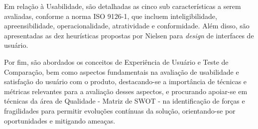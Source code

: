 Em relação à Usabilidade, são detalhadas as cinco sub características a serem avaliadas, conforme a norma ISO 9126-1, que incluem inteligibilidade, apreensibilidade, operacionalidade, 
atratividade e conformidade. Além disso, são apresentadas as dez heurísticas propostas por Nielsen para \textit{design} de interfaces de usuário. 

Por fim, são abordados os conceitos de Experiência de Usuário e Teste de Comparação, bem como aspectos fundamentais na avaliação de usabilidade e satisfação do usuário com o produto, 
destacando-se a importância de técnicas e métricas relevantes para a avaliação desses aspectos, e procurando apoiar-se em técnicas da área de Qualidade - Matriz de SWOT - na identificação de 
forças e fragilidades para permitir evoluções contínuas da solução, orientando-se por oportunidades e mitigando ameaças.
